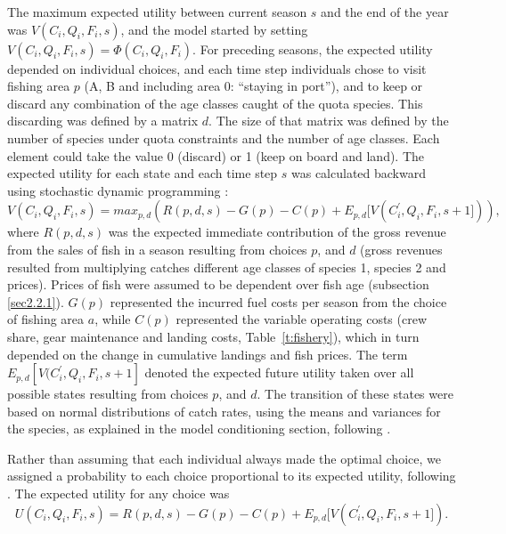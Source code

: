 \documentclass[12pt,oneline,a4paper,numbib]{ouparticle}
\numberwithin{equation}{subsection} %
\begin{document}
The maximum expected utility between current season $s$ and the end of the year was $V (C_i, Q_i, F_i, s)$, and the model started by setting $V (C_i, Q_i, F_i, s)= \Phi (C_i, Q_i, F_i)$. For preceding seasons, the expected utility depended on individual choices, and each time step individuals chose to visit fishing area $p$ (A, B and including area 0: “staying in port”), and to keep or discard any combination of the age classes caught of the quota species. This discarding was defined by a matrix $d$. The size of that matrix was defined by the number of species under quota constraints and the number of age classes. Each element could take the value 0 (discard) or 1 (keep on board and land). The expected utility for each state and each time step $s$ was calculated backward using stochastic dynamic programming \cite{ClarkandMangel2000}:
\begin{equation}
V (C_i, Q_i, F_i, s) = max_{p,d}( R(p, d, s)- G(p) - C(p) + E_{p, d}[V (C_i^\prime, Q_i, F_i, s+1])),
\end{equation}
where $R(p, d, s)$ was the expected immediate contribution of the gross revenue from the sales of fish in a season resulting from choices $p$, and $d$ (gross revenues resulted from multiplying catches different age classes of species 1, species 2 and prices). Prices of fish were assumed to be dependent over fish age (subsection \ref{sec2.2.1}). $G(p)$ represented the incurred fuel costs per season from the choice of fishing area $a$, while  $ C(p)$ represented the variable operating costs (crew share, gear maintenance and landing costs, Table~\ref{t:fishery}), which in turn depended on the change in cumulative landings and fish prices. The term $E_{p, d}[V (C_i^\prime, Q_i, F_i, s+1]$ denoted the expected future utility taken over all possible states resulting from choices $p$, and $d$. The transition of these states were based on normal distributions of catch rates, using the means and variances for the species, as explained in the model conditioning section, following \cite{Poos2010}.

Rather than assuming that each individual always made the optimal choice, we assigned a probability to each choice proportional to its expected utility, following \cite{Dowling2011}. The expected utility for any choice was
\begin{equation}
U (C_i, Q_i, F_i, s) = R(p, d, s)- G(p) - C(p) + E_{p, d}[V (C_i^\prime, Q_i, F_i, s+1]).
\end{equation}
\end{document}
